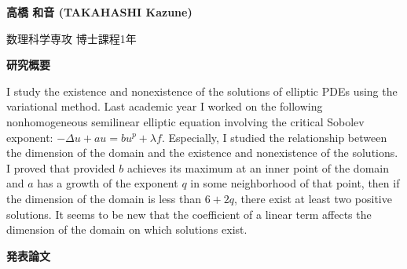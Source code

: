 

{\bf 高橋 和音 (TAKAHASHI Kazune)}



数理科学専攻 博士課程1年


\vspace{0.2cm}
\noindent
{\bf 研究概要}

\vspace{0.1cm}

I study the existence and nonexistence of the solutions
of elliptic PDEs using the variational method.
Last academic year I worked on the following
nonhomogeneous semilinear elliptic equation
involving the critical Sobolev exponent:
$-\Delta u + a u = b u^p + \lambda f$. Especially, I studied
the relationship between the dimension of the domain and
the existence and nonexistence of the solutions.
I proved that provided 
$b$ achieves its maximum at an inner point of the
domain and $a$ has a growth of the exponent $q$
in some neighborhood of that point, then
if the dimension of the domain is less than $6 + 2q$,
there exist at least two positive solutions.
It seems to be new that the coefficient of a linear term affects
the dimension of the domain on which solutions exist. 

\vspace{0.2cm}
\noindent
{\bf 発表論文}

\vspace{0.1cm}

